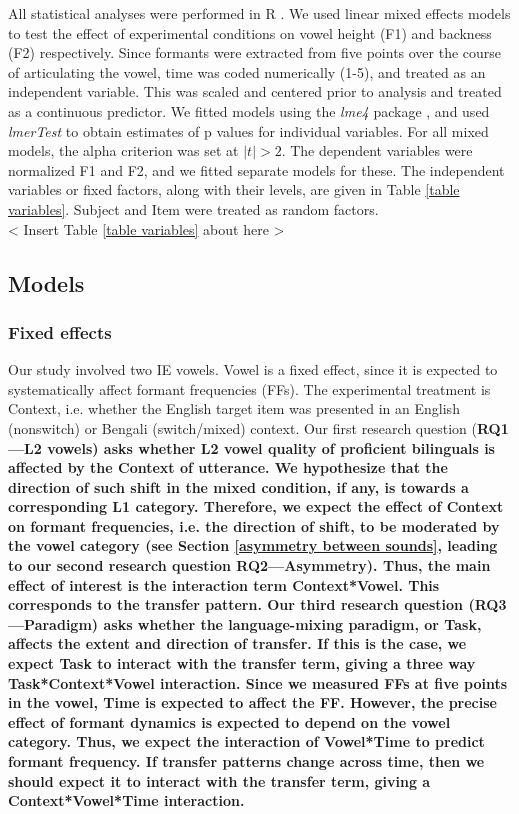 \documentclass[12 pt]{article}
\begin{document}
All statistical analyses were performed in R \citep{r}. We used linear mixed effects models to test the effect of experimental conditions on vowel height (F1) and backness (F2) respectively. Since formants were extracted from five points over the course of articulating the vowel, time was coded numerically (1-5), and treated as an independent variable. This was scaled and centered prior to analysis and treated as a continuous predictor. We fitted models using the \emph{lme4} package \citep{lme4}, and used \emph{lmerTest} \citep{lmerTest} to obtain estimates of p values for individual variables. For all mixed models, the alpha criterion was set at $|t| > 2 $. The dependent variables were normalized F1 and F2, and we fitted separate models for these. The independent variables or fixed factors, along with their levels, are given in Table \ref{table variables}. Subject and Item were treated as random factors.\\

< Insert Table \ref{table variables} about here > \\

\subsection{Models}

\subsubsection*{Fixed effects}

Our study involved two IE vowels. Vowel is a fixed effect, since it is expected to systematically affect formant frequencies (FFs). The experimental treatment is Context, i.e. whether the English target item was presented in an English (nonswitch) or Bengali (switch/mixed) context. Our first research question (\bf{RQ1---L2 vowels}) asks whether L2 vowel quality of proficient bilinguals is affected by the Context of utterance. We hypothesize that the direction of such shift in the mixed condition, if any, is towards a corresponding L1 category. Therefore, we expect the effect of Context on formant frequencies, i.e. the direction of shift, to be moderated by the vowel category (see Section \ref{asymmetry between sounds}, leading to our second research question \textbf{RQ2---Asymmetry}). Thus, the main effect of interest is the interaction term Context*Vowel. This corresponds to the transfer pattern. Our third research question (\bf{RQ3---Paradigm}) asks whether the language-mixing paradigm, or Task, affects the extent and direction of transfer. If this is the case, we expect Task to interact with the transfer term, giving a three way Task*Context*Vowel interaction. Since we measured FFs at five points in the vowel, Time is expected to affect the FF. However, the precise effect of formant dynamics is expected to depend on the vowel category. Thus, we expect the interaction of Vowel*Time to predict formant frequency. If transfer patterns change across time, then we should expect it to interact with the transfer term, giving a Context*Vowel*Time interaction.
\end{document}
